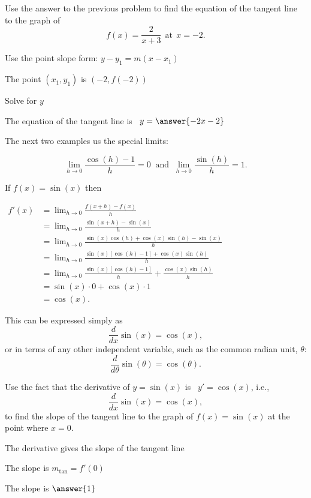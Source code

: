 \documentclass{ximera}
\begin{document}
\begin{problem} %
Use the answer to the previous problem to find the equation of the tangent line to the graph of 
\[
f(x) = \frac{2}{x+3} \  \  \text{at} \  \ x=-2.
\]

\begin{hint}
Use the point slope form: $y-y_1 = m(x-x_1)$
\end{hint}
\begin{hint}
The point $(x_1,y_1)$ is $(-2, f(-2))$
\end{hint}
\begin{hint}
Solve for $y$
\end{hint}
The equation of the tangent line is \  $y = \answer{-2x-2}$
\end{problem}


The next two examples us the special limits:

\[\lim_{h \to 0} \frac{\cos(h) -1}{h}=0 \;\;\mbox{and} \;\; \lim_{h \to 0}\frac{\sin(h)}{h} = 1.\]


\begin{example} %
If $f(x) = \sin(x)$ then
\begin{center}
$\begin{aligned}
f'(x) &= \lim_{h \to 0} \frac{f(x+h)-f(x)}{h} \\[5pt]
&= \lim_{h \to 0} \frac{\sin(x+h) - \sin(x)}{h}\\[5pt]
&=  \lim_{h \to 0} \frac{\sin(x)\cos(h) + \cos(x)\sin(h) - \sin(x)}{h}\\[5pt]
&=  \lim_{h \to 0} \frac{\sin(x)[\cos(h) -1] + \cos(x)\sin(h)}{h}\\[5pt]
&=  \lim_{h \to 0} \frac{\sin(x)[\cos(h) -1]}{h} + \frac{\cos(x)\sin(h)}{h}\\[5pt]
&=  \sin(x) \cdot 0 + \cos(x) \cdot 1 \\[5pt]
&= \cos(x).
\end{aligned}$
\end{center}
This can be expressed simply as
\[
\frac{d}{dx}\sin(x) = \cos(x),
\]
or in terms of any other independent variable, such as the common radian unit, $\theta$:
\[
\frac{d}{d\theta}\sin(\theta) = \cos(\theta).
\]
\end{example}


\begin{problem} %
Use the fact that the derivative of $y = \sin(x)$ is \ $y' = \cos(x)$,
i.e., 
\[
\frac{d}{dx}\sin(x) = \cos(x),
\]
to find the slope of the tangent line to the graph of 
$f(x) = \sin(x)$ at the point where $x = 0$.\\
\begin{hint}
The derivative gives the slope of the tangent line
\end{hint}
\begin{hint}
The slope is $m_{\text{tan}} = f'(0)$
\end{hint}
The slope is $\answer{1}$
\end{problem}
\end{document}
